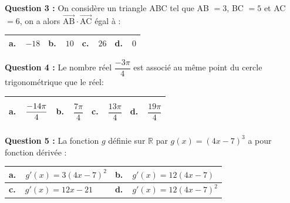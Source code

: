 \documentclass[10pt]{article}
\providecommand{\R}{\mathbb{R}}
\providecommand{\vect}[1]{\overrightarrow{#1}}
\begin{document}
\textbf{Question 3 :} On considère un triangle ABC tel que AB $= 3$, BC $= 5$ et AC $= 6$, on a alors $\vect{\text{AB}} \cdot \vect{\text{AC}}$ égal à :

\begin{center}
\begin{tabularx}{\linewidth}{|*{4}{X|}}\hline
\textbf{a.~~}$-18$&\textbf{b.~~}$10$&\textbf{c.~~}$26$&\textbf{d.~~}$0$\\ \hline
\end{tabularx}
\end{center}

\textbf{Question 4 :} Le nombre réel $\dfrac{- 3\pi}{4} $ est associé au même point du cercle trigonométrique que le réel:

\begin{center}
\begin{tabularx}{\linewidth}{|*{4}{X|}}\hline
\textbf{a.~~}$\dfrac{- 14\pi\rule{0pt}{12pt}}{4\rule[-5pt]{0pt}{0pt}}$&\textbf{b.~~}$\dfrac{7\pi}{4}$&\textbf{c.~~}$\dfrac{13\pi}{4}$&\textbf{d.~~}$\dfrac{19\pi}{4}$\\ \hline
\end{tabularx}
\end{center}

\textbf{Question 5 :} La fonction $g$ définie sur $\R$ par $g(x) = (4x - 7)^3$ a pour fonction dérivée :

\begin{center}
\begin{tabularx}{\linewidth}{|*{2}{X|}}\hline
\textbf{a.~~}$g'(x) = 3(4x - 7)^2$&\textbf{b.~~}$g'(x) = 12(4x - 7)$\\ \hline
\textbf{c.~~}$g'(x) = 12x - 21$&\textbf{d.~~}$g'(x) =  12(4x - 7)^2$\\ \hline
\end{tabularx}
\end{center}

\bigskip
\end{document}
